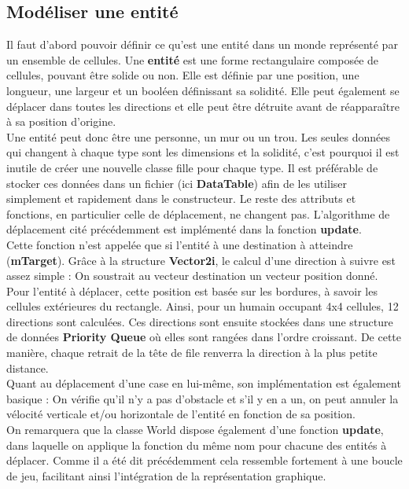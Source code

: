 \documentclass[11pt]{article} %
\begin{document}
\subsection{Modéliser une entité}
Il faut d'abord pouvoir définir ce qu'est une entité dans un monde représenté par un ensemble de cellules. 
Une \textbf{entité} est une forme rectangulaire composée de cellules, pouvant être solide ou non. Elle est définie par une position, une longueur, une largeur et un booléen définissant sa solidité. Elle peut également se déplacer dans toutes les directions et elle peut être détruite avant de réapparaître à sa position d'origine. \\
Une entité peut donc être une personne, un mur ou un trou. Les seules données qui changent à chaque type sont les dimensions et la solidité, c'est pourquoi il est inutile de créer une nouvelle classe fille pour chaque type. Il est préférable de stocker ces données dans un fichier (ici \textbf{DataTable}) afin de les utiliser simplement et rapidement dans le constructeur. Le reste des attributs et fonctions, en particulier celle de déplacement, ne changent pas.
 L'algorithme de déplacement cité précédemment est implémenté dans la fonction \textbf{update}. \\
Cette fonction n'est appelée que si l'entité à une destination à atteindre (\textbf{mTarget}). Grâce à la structure \textbf{Vector2i}, le calcul d'une direction à suivre est assez simple : On soustrait au vecteur destination un vecteur position donné. Pour l'entité à déplacer, cette position est basée sur les bordures, à savoir les cellules extérieures du rectangle. Ainsi, pour un humain occupant 4x4 cellules, 12 directions sont calculées. Ces directions sont ensuite stockées dans une structure de données \textbf{Priority Queue} où elles sont rangées dans l'ordre croissant. De cette manière, chaque retrait de la tête de file renverra la direction à la plus petite distance. \\

Quant au déplacement d'une case en lui-même, son implémentation est également basique : On vérifie qu'il n'y a pas d'obstacle et s'il y en a un, on peut annuler la vélocité verticale et/ou horizontale de l'entité en fonction de sa position. \\
On remarquera que la classe World dispose également d'une fonction \textbf{update}, dans laquelle on applique la fonction du même nom pour chacune des entités à déplacer. Comme il a été dit précédemment cela ressemble fortement à une boucle de jeu, facilitant ainsi l'intégration de la représentation graphique.
\end{document}
